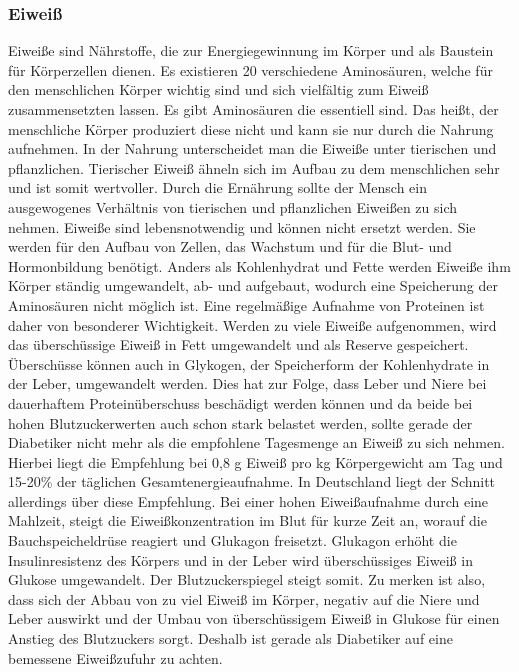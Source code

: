 \documentclass[a4paper,11pt]{article}%
\renewcommand{\\}{\vspace*{0.5\baselineskip} \newline}
\begin{document}
	\subsubsection{Eiweiß}
		Eiweiße sind Nährstoffe, die zur Energiegewinnung im Körper und als Baustein für Körperzellen dienen. Es existieren 20 verschiedene Aminosäuren, welche für den menschlichen Körper wichtig sind und sich vielfältig zum Eiweiß zusammensetzten lassen. Es gibt Aminosäuren die essentiell sind. Das heißt, der menschliche Körper produziert diese nicht und kann sie nur durch die Nahrung aufnehmen. In der Nahrung unterscheidet man die Eiweiße unter tierischen und pflanzlichen. Tierischer Eiweiß ähneln sich im Aufbau zu dem menschlichen sehr und ist somit wertvoller. Durch die Ernährung sollte der Mensch ein ausgewogenes Verhältnis von tierischen und pflanzlichen Eiweißen zu sich nehmen. Eiweiße sind lebensnotwendig und können nicht ersetzt werden.\cite{ND} Sie werden für den Aufbau von Zellen, das Wachstum und für die Blut- und Hormonbildung benötigt. \newline
		Anders als Kohlenhydrat und Fette werden Eiweiße ihm Körper ständig umgewandelt, ab- und aufgebaut, wodurch eine Speicherung der Aminosäuren nicht möglich ist. Eine regelmäßige Aufnahme von Proteinen ist daher von besonderer Wichtigkeit. \newline
		Werden zu viele Eiweiße aufgenommen, wird das überschüssige Eiweiß in Fett umgewandelt und als Reserve gespeichert. Überschüsse können auch in Glykogen, der Speicherform der Kohlenhydrate in der Leber, umgewandelt werden. Dies hat zur Folge, dass Leber und Niere bei dauerhaftem Proteinüberschuss beschädigt werden können und da beide bei hohen Blutzuckerwerten auch schon stark belastet werden, sollte gerade der Diabetiker nicht mehr als die empfohlene Tagesmenge an Eiweiß zu sich nehmen.\cite{SG} Hierbei liegt die Empfehlung bei 0,8 g Eiweiß pro kg Körpergewicht am Tag und 15-20\% der täglichen Gesamtenergieaufnahme. In Deutschland liegt der Schnitt allerdings über diese Empfehlung.\cite{ND}\newline
		Bei einer hohen Eiweißaufnahme durch eine Mahlzeit, steigt die Eiweißkonzentration im Blut für kurze Zeit an, worauf die Bauchspeicheldrüse reagiert und Glukagon freisetzt. Glukagon erhöht die Insulinresistenz des Körpers und in der Leber wird überschüssiges Eiweiß in Glukose umgewandelt. Der Blutzuckerspiegel steigt somit.\cite{SG}\\
		Zu merken ist also, dass sich der Abbau von zu viel Eiweiß im Körper, negativ auf die Niere und Leber auswirkt und der Umbau von überschüssigem Eiweiß in Glukose für einen Anstieg des Blutzuckers sorgt. Deshalb ist gerade als Diabetiker auf eine bemessene Eiweißzufuhr zu achten.
\end{document}
